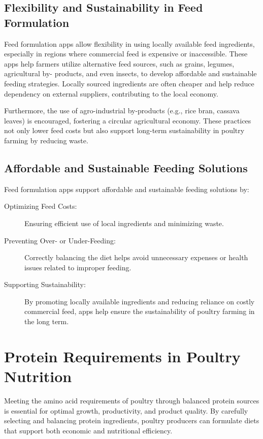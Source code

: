 \documentclass[a4paper,12pt]{article}
\begin{document}
\subsection{Flexibility and Sustainability in Feed Formulation}
Feed formulation apps allow flexibility in using locally available feed ingredients,
especially in regions where commercial feed is expensive or inaccessible. These apps
help farmers utilize alternative feed sources, such as grains, legumes, agricultural by-
products, and even insects, to develop affordable and sustainable feeding strategies.
Locally sourced ingredients are often cheaper and help reduce dependency on external
suppliers, contributing to the local economy.


Furthermore, the use of agro-industrial by-products (e.g., rice bran, cassava leaves) is
encouraged, fostering a circular agricultural economy. These practices not only lower
feed costs but also support long-term sustainability in poultry farming by reducing
waste.

\subsection{Affordable and Sustainable Feeding Solutions}
Feed formulation apps support affordable and sustainable feeding solutions by:

\begin{description}
	\item[Optimizing Feed Costs:] Ensuring efficient use of local ingredients and
minimizing waste.
	\item[Preventing Over- or Under-Feeding:] Correctly balancing the diet helps avoid
unnecessary expenses or health issues related to improper feeding.
	\item[Supporting Sustainability:] By promoting locally available ingredients and
reducing reliance on costly commercial feed, apps help ensure the sustainability
of poultry farming in the long term.
\end{description}

\newpage
\section{Protein Requirements in Poultry Nutrition}
Meeting the amino acid requirements of poultry through balanced protein sources is
essential for optimal growth, productivity, and product quality. By carefully selecting and
balancing protein ingredients, poultry producers can formulate diets that support both
economic and nutritional efficiency.
\end{document}

